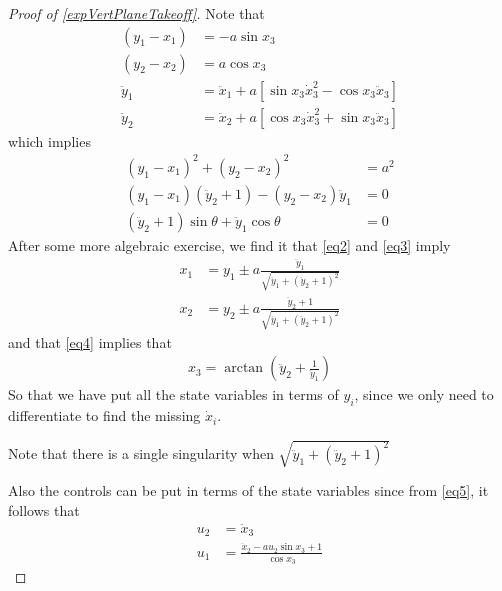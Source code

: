 \documentclass[12pt]{article}
\begin{document}
\begin{proof}[ Proof of \ref{expVertPlaneTakeoff}]
  Note that
  \begin{align}
    (y_1 - x_1) &= - a \sin{x_3} \\
    (y_2 - x_2) &= a \cos{x_3} \\
    \ddot{y}_1 &= \ddot{x}_1 + a[ \sin{x_3} \dot{x}_3^2 - \cos{x_3} \ddot{x}_3 ] \\
    \ddot{y}_2 &= \ddot{x}_2 + a[ \cos{x_3} \dot{x}_3^2 + \sin{x_3} \ddot{x}_3 ]
  \end{align}
  which implies
  \begin{align}
    (y_1 - x_1)^2 + ( y_2 - x_2 )^2 &= a^2 \label{eq2} \\
    (y_1 - x_1)(\ddot{y}_2 + 1 ) -  ( y_2 - x_2 )\ddot{y}_1 &= 0 \label{eq3} \\
    (\ddot{y}_2 + 1 ) \sin{\theta} + \ddot{y}_1 \cos{\theta} &= 0 \label{eq4}
  \end{align}
  After some more algebraic exercise, we find it that \eqref{eq2} and \eqref{eq3} imply
  \begin{align}
    x_1 &= y_1 \pm a \frac{\ddot{y}_1}{\sqrt{\ddot{y}_1 + (\ddot{y}_2 + 1)^2 }} \\
    x_2 &= y_2 \pm a \frac{\ddot{y}_2 + 1}{\sqrt{\ddot{y}_1 + (\ddot{y}_2 + 1)^2 }} 
  \end{align}
  and that \eqref{eq4} implies that
  \begin{align}
    x_3 = \arctan{ \left( \ddot{y}_2 + \frac{1}{\ddot{y}_1} \right)}
  \end{align}
  So that we have put all the state variables in terms of $y_i$,
  since we only need to differentiate to find
  the missing $\dot{x}_i$.
  
  Note that there is a single singularity when $\sqrt{\ddot{y}_1 + (\ddot{y}_2 + 1)^2}$
  
  Also the controls can be put in terms of the state variables since from \eqref{eq5}, it follows that
  \begin{align}
    u_2 &= \ddot{x}_3 \\
    u_1 &= \frac{\ddot{x}_2 - a u_2 \sin{x_3} + 1}{\cos{x_3}}
  \end{align}
\end{proof}
\end{document}
